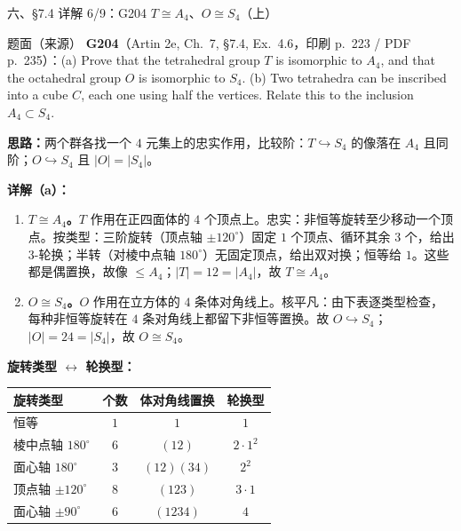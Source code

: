 \documentclass[aspectratio=169,10pt,fontset=none]{ctexbeamer}
\newcommand{\ex}[1]{\textcolor{accent}{\footnotesize\bfseries #1}}
\newcommand{\key}[1]{\textcolor{ink}{\bfseries #1}}
\begin{document}
\begin{frame}[t]{六、\S7.4 详解 6/9：G204 $T\cong A_4$、$O\cong S_4$（上）}
\label{ex:G204}
\scriptsize
\begin{block}{\footnotesize 题面（来源）}
\ex{G204}（Artin 2e, Ch.~7, \S7.4, Ex.~4.6，印刷 p.~223 / PDF p.~235）：(a) Prove that the tetrahedral group $T$ is isomorphic to $A_4$, and that the octahedral group $O$ is isomorphic to $S_4$. (b) Two tetrahedra can be inscribed into a cube $C$, each one using half the vertices. Relate this to the inclusion $A_4\subset S_4$.
\end{block}
\key{思路：}两个群各找一个 $4$ 元集上的忠实作用，比较阶：$T\hookrightarrow S_4$ 的像落在 $A_4$ 且同阶；$O\hookrightarrow S_4$ 且 $|O|=|S_4|$。

\key{详解（a）：}
\begin{enumerate}\setlength{\itemsep}{1pt}
\item \textbf{$T\cong A_4$。}$T$ 作用在正四面体的 $4$ 个顶点上。忠实：非恒等旋转至少移动一个顶点。按类型：三阶旋转（顶点轴 $\pm120^\circ$）固定 $1$ 个顶点、循环其余 $3$ 个，给出 3-轮换；半转（对棱中点轴 $180^\circ$）无固定顶点，给出双对换；恒等给 $1$。这些都是偶置换，故像 $\le A_4$；$|T|=12=|A_4|$，故 $T\cong A_4$。
\item \textbf{$O\cong S_4$。}$O$ 作用在立方体的 $4$ 条体对角线上。核平凡：由下表逐类型检查，每种非恒等旋转在 $4$ 条对角线上都留下非恒等置换。故 $O\hookrightarrow S_4$；$|O|=24=|S_4|$，故 $O\cong S_4$。
\end{enumerate}
\key{旋转类型 $\leftrightarrow$ 轮换型：}
\begin{center}
\renewcommand{\arraystretch}{1.06}
\begin{tabular}{@{}l c c c@{}}
\toprule
旋转类型 & 个数 & 体对角线置换 & 轮换型\\
\midrule
恒等 & $1$ & $1$ & $1$\\
棱中点轴 $180^\circ$ & $6$ & $(12)$ & $2\cdot1^2$\\
面心轴 $180^\circ$ & $3$ & $(12)(34)$ & $2^2$\\
顶点轴 $\pm120^\circ$ & $8$ & $(123)$ & $3\cdot1$\\
面心轴 $\pm90^\circ$ & $6$ & $(1234)$ & $4$\\
\bottomrule
\end{tabular}
\end{center}
\end{frame}
\end{document}
